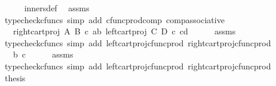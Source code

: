 \begin{isabellebody}
\ \ \ \ \isamarkupfalse%
\ inners{\isacharunderscore}{\kern0pt}def\ \isamarkupfalse%
\ assms\ \isamarkupfalse%
\ {\isacharparenleft}{\kern0pt}typecheck{\isacharunderscore}{\kern0pt}cfuncs{\isacharcomma}{\kern0pt}\ simp\ add{\isacharcolon}{\kern0pt}\ cfunc{\isacharunderscore}{\kern0pt}prod{\isacharunderscore}{\kern0pt}comp\ comp{\isacharunderscore}{\kern0pt}associative{}{\isacharparenright}{\kern0pt}\isanewline
\ \ \isamarkupfalse%
\ \isamarkupfalse%
\ {\isachardoublequoteopen}{\isachardot}{\kern0pt}{\isachardot}{\kern0pt}{\isachardot}{\kern0pt}\ {\isacharequal}{\kern0pt}\ {\isasymlangle}right{\isacharunderscore}{\kern0pt}cart{\isacharunderscore}{\kern0pt}proj\ A\ B\ {\isasymcirc}\isactrlsub c\ {\isasymlangle}a{\isacharcomma}{\kern0pt}b{\isasymrangle}{\isacharcomma}{\kern0pt}\ left{\isacharunderscore}{\kern0pt}cart{\isacharunderscore}{\kern0pt}proj\ C\ D\ {\isasymcirc}\isactrlsub c\ {\isasymlangle}c{\isacharcomma}{\kern0pt}d{\isasymrangle}{\isasymrangle}{\isachardoublequoteclose}\isanewline
\ \ \ \ \isamarkupfalse%
\ assms\ \isamarkupfalse%
\ {\isacharparenleft}{\kern0pt}typecheck{\isacharunderscore}{\kern0pt}cfuncs{\isacharcomma}{\kern0pt}\ simp\ add{\isacharcolon}{\kern0pt}\ left{\isacharunderscore}{\kern0pt}cart{\isacharunderscore}{\kern0pt}proj{\isacharunderscore}{\kern0pt}cfunc{\isacharunderscore}{\kern0pt}prod\ right{\isacharunderscore}{\kern0pt}cart{\isacharunderscore}{\kern0pt}proj{\isacharunderscore}{\kern0pt}cfunc{\isacharunderscore}{\kern0pt}prod{\isacharparenright}{\kern0pt}\isanewline
\ \ \isamarkupfalse%
\ \isamarkupfalse%
\ {\isachardoublequoteopen}{\isachardot}{\kern0pt}{\isachardot}{\kern0pt}{\isachardot}{\kern0pt}\ {\isacharequal}{\kern0pt}\ {\isasymlangle}b{\isacharcomma}{\kern0pt}\ c{\isasymrangle}{\isachardoublequoteclose}\isanewline
\ \ \ \ \isamarkupfalse%
\ assms\ \isamarkupfalse%
\ {\isacharparenleft}{\kern0pt}typecheck{\isacharunderscore}{\kern0pt}cfuncs{\isacharcomma}{\kern0pt}\ simp\ add{\isacharcolon}{\kern0pt}\ left{\isacharunderscore}{\kern0pt}cart{\isacharunderscore}{\kern0pt}proj{\isacharunderscore}{\kern0pt}cfunc{\isacharunderscore}{\kern0pt}prod\ right{\isacharunderscore}{\kern0pt}cart{\isacharunderscore}{\kern0pt}proj{\isacharunderscore}{\kern0pt}cfunc{\isacharunderscore}{\kern0pt}prod{\isacharparenright}{\kern0pt}\isanewline
\ \ \isamarkupfalse%
\ \isamarkupfalse%
\ {\isacharquery}{\kern0pt}thesis\isanewline

\end{isabellebody}
